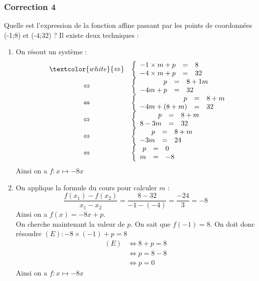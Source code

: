 \documentclass[15pt, mathserif]{beamer}
\begin{document}
\begin{frame}
\vspace{-10mm}
	\frametitle{Correction 4}
\vspace*{1cm} 
 \footnotesize{Quelle est l'expression de la fonction affine passant par les points de coordonnées (-1;8) et (-4;32) ? Il existe deux techniques :} 
 \begin{multicols}{2} 
 \begin{enumerate} 
 \item On résout un système : $$ \begin{array}{rcl} 
 & \textcolor{white}{\Leftrightarrow} & 
 \left 
 \{\begin{array}{rcl}-1\times m + p&=&8 \\ 
 -4\times m+p&=&32\end{array} \right. \\ 
 &\Leftrightarrow & \left 
 \{\begin{array}{rcl} p&=&8+1m \\ 
 -4m+p&=&32\end{array} \right. \\ 
 &\Leftrightarrow & \left 
 \{\begin{array}{rcl} p&=&8+m \\ 
 -4m+(8+m) &=&32\end{array} \right. \\ &\Leftrightarrow& \left \{\begin{array}{rcl}p&=&8+m \\ 
 8-3m&=&32\end{array} \right. \\ &\Leftrightarrow& \left \{\begin{array}{rcl}p&=&8+m \\ 
 -3m&=&24\end{array} \right. \\  &\Leftrightarrow& \left \{\begin{array}{rcl} p&=&0 \\  m&=&-8\end{array}\right. \end{array}$$ 
 Ainsi on a $f:x\mapsto -8x$ 
 \columnbreak 
 \item 
 \footnotesize{On applique la formule du cours pour calculer $m$ :$$ \dfrac{f(x_1)-f(x_2)}{x_1-x_2}=\dfrac{8-32}{-1-\left(-4\right)}= \dfrac{-24}{3}=-8$$} \footnotesize{ Ainsi on a $f(x)= -8x +p $. 
  \\ On cherche maintenant la valeur de $p$. On sait que $f(-1)=8$. On doit donc résoudre $(E): -8\times\left(-1\right)+p=8$}	 
 \begin{align*} (E)& \Leftrightarrow 8+p=8\\
		 	 & \Leftrightarrow p=8-8\\
			 & \Leftrightarrow p=0
	 \end{align*} 
 Ainsi on a $f:x\mapsto -8x$ 
 \end{enumerate} 
 \end{multicols} 
 \end{frame}
\end{document}
